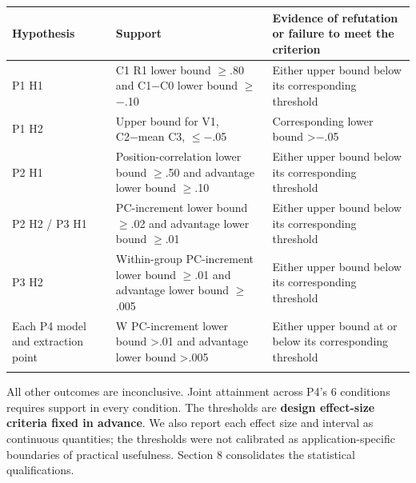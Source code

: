 \begingroup
\fontsize{9.3}{12}\selectfont\setlength{\tabcolsep}{3.3pt}
{
\begin{longtable}[]{@{}
  >{\raggedright\arraybackslash}p{}
  >{\raggedright\arraybackslash}p{}
  >{\raggedright\arraybackslash}p{}@{}}
\toprule\noalign{}
\begin{minipage}[b]{\linewidth}\raggedright
Hypothesis
\end{minipage} & \begin{minipage}[b]{\linewidth}\raggedright
Support
\end{minipage} & \begin{minipage}[b]{\linewidth}\raggedright
Evidence of refutation or failure to meet the criterion
\end{minipage} \\
\midrule\noalign{}
\endhead
\bottomrule\noalign{}
\endlastfoot
P1 H1 & C1 R1 lower bound {\(\geq\).80} and C1−C0 lower bound {\(\geq\)−.10} & Either upper bound below its corresponding threshold \\*
P1 H2 & Upper bound for V1, C2−mean C3, {\(\leq\)−.05} & Corresponding lower bound \textgreater−.05 \\*
P2 H1 & Position-correlation lower bound {\(\geq\).50} and advantage lower bound {\(\geq\).10} & Either upper bound below its corresponding threshold \\*
P2 H2 / P3 H1 & PC-increment lower bound {\(\geq\).02} and advantage lower bound {\(\geq\).01} & Either upper bound below its corresponding threshold \\*
P3 H2 & Within-group PC-increment lower bound {\(\geq\).01} and advantage lower bound {\(\geq\).005} & Either upper bound below its corresponding threshold \\*
Each P4 model and extraction point & W PC-increment lower bound \textgreater.01 and advantage lower bound \textgreater.005 & Either upper bound at or below its corresponding threshold \\*
\end{longtable}
}
\endgroup

All other outcomes are inconclusive. Joint attainment across P4's 6 conditions requires support in every condition. The thresholds are \textbf{design effect-size criteria fixed in advance}. We also report each effect size and interval as continuous quantities; the thresholds were not calibrated as application-specific boundaries of practical usefulness. Section 8 consolidates the statistical qualifications.

